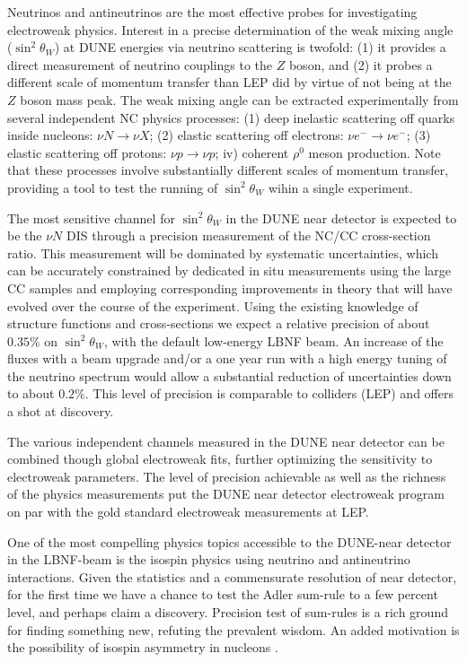 Neutrinos and antineutrinos are the most effective probes for
investigating electroweak physics.  Interest in a precise
determination of the weak mixing angle ($\sin^2 \theta_W$) at DUNE
energies via neutrino scattering is twofold: (1) it provides a direct
measurement of neutrino couplings to the $Z$ boson, and (2) it probes
a different scale of momentum transfer than LEP did by virtue of not
being at the $Z$ boson mass peak.
% 
The weak mixing angle can be extracted experimentally from several
independent NC physics processes: (1) deep inelastic scattering off
quarks inside nucleons: $\nu N \to \nu X$; (2) elastic scattering off
electrons: $\nu e^- \to \nu e^-$; (3) elastic scattering off protons:
$\nu p \to \nu p$; iv) coherent $\rho^0$ meson production.  Note that
these processes involve substantially different scales of momentum
transfer, providing a tool to test the running of $\sin^2 \theta_W$
wihin a single experiment.

The most sensitive channel for $\sin^2 \theta_W$ in the DUNE near
detector is expected to be the $\nu N$ DIS through a precision
measurement of the NC/CC cross-section
ratio. This measurement will be dominated by
systematic uncertainties, which can be accurately constrained by
dedicated in situ measurements using the large CC samples and
employing corresponding improvements in theory that will have evolved
over the course of the experiment. Using the existing knowledge of
structure functions and cross-sections we expect a relative precision
of about $0.35\%$ on $\sin^2 \theta_W$, with the default low-energy
LBNF beam. An increase of the fluxes with a beam upgrade and/or a one
year run with a high energy tuning of the neutrino spectrum would
allow a substantial reduction of uncertainties down to about $0.2\%$.
This level of precision is comparable to colliders (LEP) and offers a
shot at discovery.
 
The various independent channels measured in the DUNE near detector
can be combined though global electroweak fits, further optimizing the
sensitivity to electroweak parameters. The level of precision
achievable as well as the richness of the physics measurements put the
DUNE near detector electroweak program on par with the gold standard
electroweak measurements at LEP.

One of the most compelling physics topics accessible to the DUNE-near
detector in the LBNF-beam is the isospin physics using neutrino and
antineutrino interactions. Given the statistics and a commensurate
resolution of near detector, for the first time we have a chance to
test the Adler sum-rule to a few percent level, and perhaps claim a
discovery.  Precision test of sum-rules is a rich ground for finding
something new, refuting the prevalent wisdom.  An added motivation is
the possibility of isospin asymmetry in nucleons .

